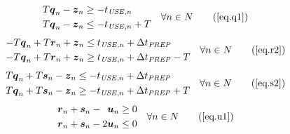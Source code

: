 \begin{equation}
    \begin{split}
        \begin{alignedat}{2}
            T \boldsymbol{q}_{n} - \boldsymbol{z}_{n} &\ge
            - t_{\mathit{USE},n}\\
            T \boldsymbol{q}_{n} - \boldsymbol{z}_{n} &\le
            - t_{\mathit{USE},n} + T\\
        \end{alignedat}
    \end{split}
    \quad \forall n \in N
    \tag{\ref{eq.q1}}
\end{equation}
\begin{equation}
    \begin{split}
        \begin{alignedat}{2}
            -T \boldsymbol{q}_{n} + T \boldsymbol{r}_{n} + \boldsymbol{z}_{n}
            &\le t_{\mathit{USE},n} + \Delta t_{\mathit{PREP}}\\
            -T \boldsymbol{q}_{n} + T \boldsymbol{r}_{n} + \boldsymbol{z}_{n}
            &\ge t_{\mathit{USE},n} + \Delta t_{\mathit{PREP}} - T\\
            \end{alignedat}
        \quad \forall n \in N
    \end{split}
    \tag{\ref{eq.r2}}
\end{equation}
\begin{equation}
    \begin{split}
        \begin{alignedat}{2}
            T \boldsymbol{q}_{n} + T \boldsymbol{s}_{n} - \boldsymbol{z}_{n}
            &\le -t_{\mathit{USE},n} + \Delta t_{\mathit{PREP}}\\
            T \boldsymbol{q}_{n} + T \boldsymbol{s}_{n} - \boldsymbol{z}_{n}
            &\ge -t_{\mathit{USE},n} + \Delta t_{\mathit{PREP}} + T\\
            \end{alignedat}
        \quad \forall n \in N
    \end{split}
    \tag{\ref{eq.s2}}
\end{equation}
\begin{equation}
    \begin{split}
        \begin{alignedat}{8}
            &&\boldsymbol{r}_{n} && {}+{} &&\boldsymbol{s}_{n} && {}-{} 
            &&\boldsymbol{u}_{n} &\ge 0\\
            &&\boldsymbol{r}_{n} && {}+{} &&\boldsymbol{s}_{n} && {}-{} 
            &2&\boldsymbol{u}_{n} &\le 0\\
        \end{alignedat}
        \quad \forall n \in N
    \end{split}
    \tag{\ref{eq.u1}}
\end{equation}
